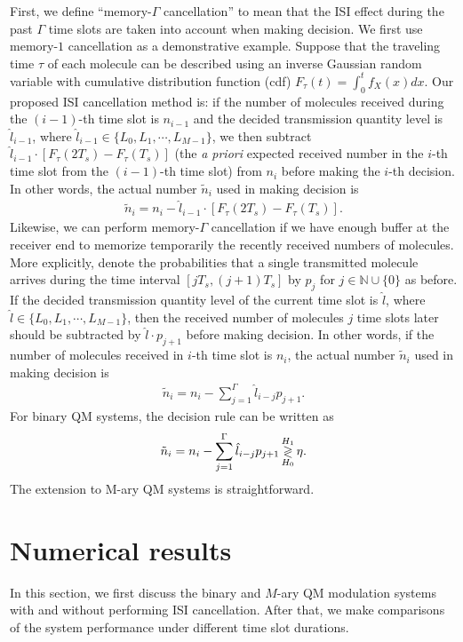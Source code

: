 First, we define ``memory-$\Gamma$ cancellation'' to mean that the ISI effect during the past $\Gamma$ time slots are taken into account when making decision. We first use memory-$1$ cancellation as a demonstrative example.
Suppose that the traveling time $\tau$ of each molecule can be described using an inverse Gaussian random variable with cumulative distribution function (cdf) $F_{\tau}(t)=\int_0^t f_X(x)dx$. Our proposed ISI cancellation method is: if the number of molecules received during the $(i-1)$-th time slot is $n_{i-1}$ and the decided transmission quantity level is $\hat{l}_{i-1}$, where $\hat{l}_{i-1} \in \{ L_0,L_1,\cdots,L_{M-1} \}$, we then subtract $\hat{l}_{i-1}\cdot[F_{\tau}(2T_s)-F_{\tau}(T_s)]$ (the \emph{a priori} expected received number in the $i$-th time slot from the $(i-1)$-th time slot) from $n_i$ before making the $i$-th decision. In other words, the actual number $\tilde{n}_i$ used in making decision is
\begin{eqnarray}
\tilde{n}_i = n_i - \hat{l}_{i-1}\cdot[F_{\tau}(2T_s)-F_{\tau}(T_s)].
\end{eqnarray}
Likewise, we can perform memory-$\Gamma$ cancellation if we have enough buffer at the receiver end to memorize temporarily the recently received numbers of molecules. More explicitly, denote the probabilities that a single transmitted molecule arrives during the time interval $[ j T_s,(j+1) T_s ]$ by $p_j$ for $j\in \mathbb{N} \cup \{0\}$ as before. If the decided transmission quantity level of the current time slot is $\hat{l}$, where $\hat{l} \in \{ L_0,L_1,\cdots,L_{M-1} \}$, then the received number of molecules $j$ time slots later should be subtracted by
$\hat{l} \cdot p_{j+1}$ before making decision. In other words, if the number of molecules received in $i$-th time slot is $n_i$, the actual number $\tilde{n}_i$ used in making decision is
\begin{eqnarray}
\tilde{n}_i = n_i - \sum^{\Gamma}_{j=1}\hat{l}_{i-j}p_{j+1}.
\end{eqnarray}
For binary QM systems, the decision rule can be written as
\begin{eqnarray}
\tilde{n}_i = n_i - \sum^{\Gamma}_{j=1}\hat{l}_{i-j}p_{j+1} \decision ^{H_1}_{H_0} \eta.
\end{eqnarray}
The extension to M-ary QM systems is straightforward.

\section{Numerical results}
In this section, we first discuss the binary and $M$-ary QM modulation systems with and without performing ISI cancellation.
After that, we make comparisons of the system performance under different time slot durations.

